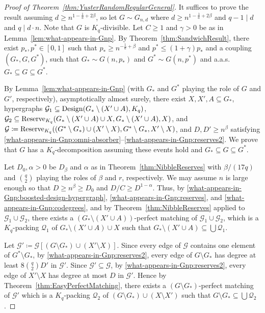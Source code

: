 \documentclass[11pt]{article}
\numberwithin{equation}{section}
\newcommand{\mc}[1]{\mathcal{#1}}
\newcounter{i}
\theoremstyle{plain}
\theoremstyle{plain} %
\theoremstyle{definition}
\newcommand{\cG}{\mathcal{G}}
\newcommand{\aas}{a.a.s.\ }
\begin{document}
\begin{proof}[Proof of Theorem~\ref{thm:YusterRandomRegularGeneral}]
It suffices to prove the result assuming $d \geq n^{1 - \frac{1}{a} + 2\beta}$, so let $G \sim G_{n,d}$ where $d \geq n^{1 - \frac{1}{a} + 2\beta}$ and $q - 1 \mid d$ and $q \mid d\cdot n$.  Note that $G$ is $K_q$-divisible.
Let $C \geq 1$ and $\gamma > 0$ be as in Lemma~\ref{lem:what-appears-in-Gnp}.  By Theorem~\ref{thm:SandwichResult}, there exist $p_*, p^* \in [0, 1]$ such that $p_* \geq n^{-\frac{1}{a} + \beta}$ and $p^* \leq (1 + \gamma)p_*$ and a coupling $(G_*, G, G^*)$, such that $G_* \sim G(n,p_*)$ and $G^* \sim G(n,p^*)$ and \aas $G_* \subseteq G \subseteq G^*$.

By Lemma~\ref{lem:what-appears-in-Gnp} (with $G_*$ and $G^*$ playing the role of $G$ and $G'$, respectively), asymptotically almost surely, there exist $X, X', A \subseteq G_*$, hypergraphs $\cG_1 \subseteq {\rm Design}(G_* \setminus (X' \cup A), K_q)$, $\cG_2 \subseteq {\rm Reserve}_{K_q}(G_*\setminus (X' \cup A) \cup X, G_* \setminus (X' \cup A), X)$, and $\cG \coloneqq {\rm Reserve}_{K_q}((G^* \setminus G_*) \cup (X' \setminus X), G^* \setminus G_*, X' \setminus X)$, and $D,D' \geq n^\beta$ satisfying \ref{what-appears-in-Gnp:omni-absorber}--\ref{what-appears-in-Gnp:reserves2}.  We prove that $G$ has a $K_q$-decomposition assuming these events hold and $G_* \subseteq G \subseteq G^*$.

Let $D_0, \alpha > 0$ be $D_\beta$ and $\alpha$ as in Theorem~\ref{thm:NibbleReserves} with $\beta / (17q)$ and $\binom{q}{2}$ playing the roles of $\beta$ and $r$, respectively.  We may assume $n$ is large enough so that $D \geq n^\beta \geq D_0$ and $D / C \geq D^{1 - \alpha}$.  Thus, by \ref{what-appears-in-Gnp:boosted-design-hypergraph}, \ref{what-appears-in-Gnp:reserves}, and \ref{what-appears-in-Gnp:codegrees}, and by Theorem~\ref{thm:NibbleReserves} applied to $\cG_1 \cup \cG_2$, there exists a $(G_*\setminus (X'\cup A))$-perfect matching of $\mc{G}_1\cup \mc{G}_2$, which is a $K_q$-packing $\mathcal{Q}_1$ of $G_* \setminus (X' \cup A) \cup X$ such that $G_* \setminus (X' \cup A) \subseteq \bigcup \mc{Q}_1$. 

Let $\cG'\coloneqq \cG[(G\setminus G_*) \cup (X'\setminus X)]$.  Since every edge of $\cG$ contains one element of $G^* \setminus G_*$, by \ref{what-appears-in-Gnp:reserves2}, every edge of $G\setminus G_*$ has degree at least $8\binom{q}{2}D'$ in $\cG'$.  Since $\cG' \subseteq \cG$, by \ref{what-appears-in-Gnp:reserves2}, every edge of $X' \setminus X$ has degree at most $D$ in $\cG'$.
Hence by Theorem~\ref{thm:EasyPerfectMatching}, there exists a $(G\setminus G_*)$-perfect matching of $\mc{G'}$ which is a $K_q$-packing $\mathcal{Q}_2$ of $(G\setminus G_*)\cup (X \setminus X')$ such that $G \setminus G_* \subseteq \bigcup \mc{Q}_2$. 



\end{proof}
\end{document}
